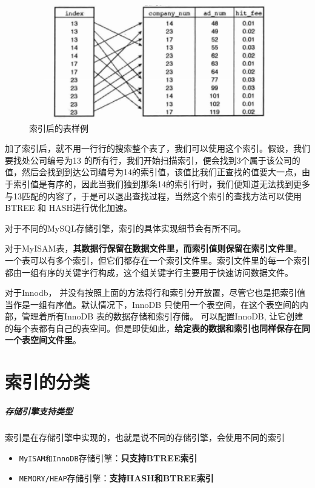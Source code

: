 \documentclass[UTF8,a4paper,12pt]{ctexbook}
\begin{document}
			\begin{figure}[H]
				\centering
				\includegraphics[width=13cm,height=5cm]{index}
				\caption{索引后的表样例}
			\end{figure}
			
			加了索引后，就不用一行行的搜索整个表了，我们可以使用这个索引。假设，我们要找处公司编号为13 的所有行，我们开始扫描索引，便会找到3个属于该公司的值，然后会找到到达公司编号为14的索引值，该值比我们正查找的值要大一点，由于索引值是有序的，因此当我们独到那条14的索引行时，我们便知道无法找到更多与13匹配的内容了，于是可以退出查找过程，当然这个索引的查找方法可以使用BTREE 和 HASH进行优化加速。
			
			
			对于不同的MySQL存储引擎，索引的具体实现细节会有所不同。
			
			对于MyISAM表，\textbf{其数据行保留在数据文件里，而索引值则保留在索引文件里}。一个表可以有多个索引，但它们都存在一个索引文件里。索引文件里的每一个索引都由一组有序的关键字行构成，这个组关键字行主要用于快速访问数据文件。
			
			对于Innodb， 并没有按照上面的方法将行和索引分开放置，尽管它也是把索引值当作是一组有序值。默认情况下，InnoDB 只使用一个表空间，在这个表空间的内部，管理着所有InnoDB 表的数据存储和索引存储。 可以配置InnoDB, 让它创建的每个表都有自己的表空间。但是即使如此，\textbf{给定表的数据和索引也同样保存在同一个表空间文件里}。
			
	
	\section{索引的分类}
		\subparagraph{存储引擎支持类型}
			索引是在存储引擎中实现的，也就是说不同的存储引擎，会使用不同的索引
			\begin{itemize}[itemindent = 2em]
				\item \verb|MyISAM和InnoDB|存储引擎：\textbf{只支持BTREE索引}
				\item \verb|MEMORY/HEAP|存储引擎：\textbf{支持HASH和BTREE索引}
			\end{itemize}
			
\end{document}

